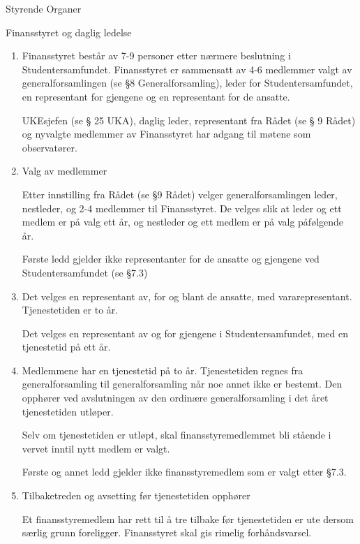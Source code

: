 \documentclass[fsbok.tex]{subfiles}
\begin{document}
\begin{lovkapittel}{Styrende Organer}
\begin{lovparagraf}{Finansstyret og daglig ledelse}

  \begin{enumerate}
  
    \item Finansstyret består av 7-9 personer etter nærmere beslutning i Studentersamfundet. Finansstyret er
    sammensatt av 4-6 medlemmer valgt av generalforsamlingen (se §8 Generalforsamling), leder for
    Studentersamfundet, en representant for gjengene og en representant for de ansatte.
    
    UKEsjefen (se § 25 UKA), daglig leder, representant fra Rådet (se § 9 Rådet) og nyvalgte medlemmer av
    Finansstyret har adgang til møtene som observatører.
    
    \item Valg av medlemmer
    
    Etter innstilling fra Rådet (se §9 Rådet) velger generalforsamlingen leder, nestleder, og 2-4 medlemmer til
    Finansstyret. De velges slik at leder og ett medlem er på valg ett år, og nestleder og ett medlem er på valg
    påfølgende år.
    
    Første ledd gjelder ikke representanter for de ansatte og gjengene ved Studentersamfundet (se §7.3)
    
    \item Det velges en representant av, for og blant de ansatte, med vararepresentant. Tjenestetiden er to år.
    
    Det velges en representant av og for gjengene i Studentersamfundet, med en tjenestetid på ett år.
    
    \item Medlemmene har en tjenestetid på to år. Tjenestetiden regnes fra generalforsamling til generalforsamling når
    noe annet ikke er bestemt. Den opphører ved avslutningen av den ordinære generalforsamling i det året
    tjenestetiden utløper.
    
    Selv om tjenestetiden er utløpt, skal finansstyremedlemmet bli stående i vervet inntil nytt medlem er valgt.
    
    Første og annet ledd gjelder ikke finansstyremedlem som er valgt etter §7.3.
    
    \item Tilbaketreden og avsetting før tjenestetiden opphører
    
    Et finansstyremedlem har rett til å tre tilbake før tjenestetiden er ute dersom særlig grunn foreligger. Finansstyret skal gis rimelig forhåndsvarsel.
    

\end{enumerate}
\end{lovparagraf}
\end{lovkapittel}
\end{document}
